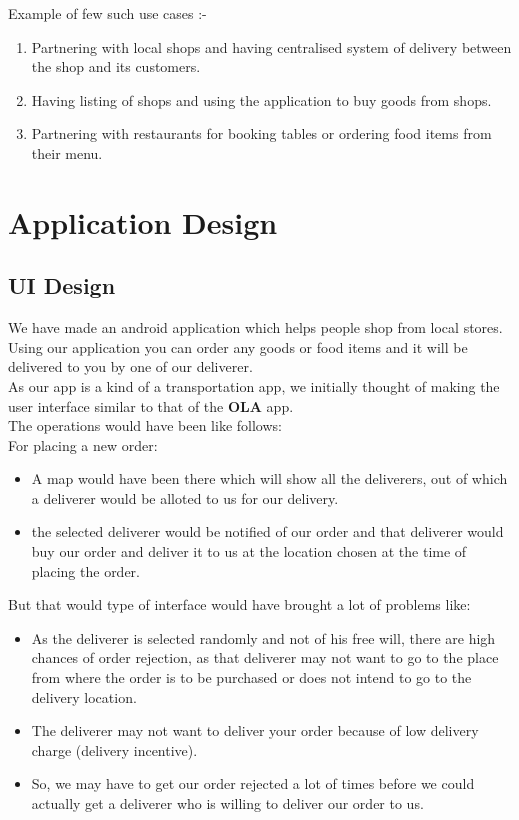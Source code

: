 \documentclass{report}
\begin{document}
Example of few such use cases :-
\begin{enumerate}[label=\alph*.]
\item Partnering with local shops and having centralised system of delivery between the shop and its customers. 
\item Having listing of shops and using the application to buy goods from shops.
\item Partnering with restaurants for booking tables or ordering food items from their menu.
\end{enumerate}

\chapter{Application Design}

\section{UI Design}
We have made an android application which helps people shop from local stores. Using our application you can order any goods or food items and it will be delivered to you by one of our deliverer.\\

As our app is a kind of a transportation app, we initially thought of making the user interface similar to that of the \textbf{OLA} app.\\
The operations would have been like follows:\\

For placing a new order:
\begin{itemize}
\item A map would have been there which will show all the deliverers, out of which a deliverer would be alloted to us for our delivery.
\item the selected deliverer would be notified of our order and that deliverer would buy our order and deliver it to us at the location chosen at the time of placing the order.
\end{itemize}

But that would type of interface would have brought a lot of problems like:
\begin{itemize}
\item As the deliverer is selected randomly and not of his free will, there are high chances of order rejection, as that deliverer may not want to go to the place from where the order is to be purchased or does not intend to go to the delivery location.
\item The deliverer may not want to deliver your order because of low delivery charge (delivery incentive).
\item So, we may have to get our order rejected a lot of times before we could actually get a deliverer who is willing to deliver our order to us.
\end{itemize}
\end{document}
